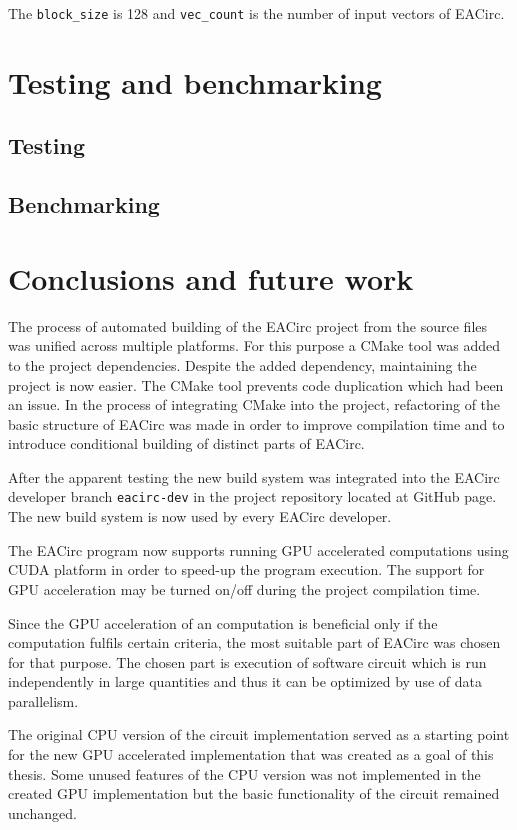 \documentclass[12pt,oneside]{fithesis2}
\begin{document}
\noindent
The \texttt{block\_size} is 128 and \texttt{vec\_count} is the number of input vectors of EACirc.

\chapter{Testing and benchmarking}

\section{Testing}
\section{Benchmarking}

\chapter{Conclusions and future work}

The process of automated building of the EACirc project from the source files was unified across multiple platforms. For this purpose a CMake tool was added to the project dependencies. Despite the added dependency, maintaining the project is now easier. The CMake tool prevents code duplication which had been an issue. In the process of integrating CMake into the project, refactoring of the basic structure of EACirc was made in order to improve compilation time and to introduce conditional building of distinct parts of EACirc.

After the apparent testing the new build system was integrated into the EACirc developer branch \texttt{eacirc-dev} in the project repository located at GitHub page. The new build system is now used by every EACirc developer.

\bigskip

The EACirc program now supports running GPU accelerated computations using CUDA platform in order to speed-up the program execution. The support for GPU acceleration may be turned on/off during the project compilation time.

Since the GPU acceleration of an computation is beneficial only if the computation fulfils certain criteria, the most suitable part of EACirc was chosen for that purpose. The chosen part is execution of software circuit which is run independently in large quantities and thus it can be optimized by use of data parallelism.

The original CPU version of the circuit implementation served as a starting point for the new GPU accelerated implementation that was created as a goal of this thesis. Some unused features of the CPU version was not implemented in the created GPU implementation but the basic functionality of the circuit remained unchanged. 
\end{document}
